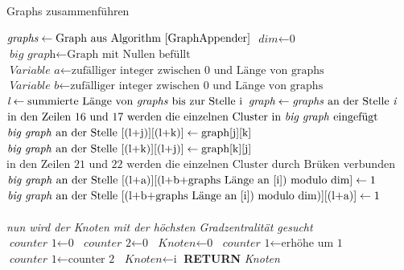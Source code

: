 \begin{algorithm}
\caption{Graphs zusammenführen}\label{uniteGraphs}
\begin{algorithmic}[1]
\State $\textit{graphs} \gets \text{Graph aus Algorithm \ref{GraphAppender}}$
\State {}
\EndIf
\State $\textit{dim} \gets \text{0}$
\State $\textit{big graph} \gets \text{Graph mit Nullen befüllt}$
\State $\textit{Variable a} \gets \text{zufälliger integer zwischen 0 und Länge von graphs}$
\State $\textit{Variable b} \gets \text{zufälliger integer zwischen 0 und Länge von graphs}$
\State $\textit{l} \gets \text{summierte Länge von \textit{graphs} bis zur Stelle i}$
\State $\textit{graph} \gets \text{\textit{graphs} an der Stelle \textit{i}}$
\\
\State $\text{in den Zeilen 16 und 17 werden die einzelnen Cluster in \textit{big graph} eingefügt}$
\\
\State $\text{\textit{big graph} an der Stelle [(l+j)][(l+k)]} \gets \text{graph[j][k]}$
\State $\text{\textit{big graph} an der Stelle [(l+k)][(l+j)]} \gets \text{graph[k][j]}$
\\ 
\State $\text{in den Zeilen 21 und 22 werden die einzelnen Cluster durch Brüken verbunden}$
\\
\State $\text{\textit{big graph} an der Stelle [(l+a)][(l+b+graphs Länge an [i]) modulo dim]} \gets \text{1}$
\State $\text{\textit{big graph} an der Stelle [(l+b+graphs Länge an [i]) modulo dim)][(l+a)]} \gets \text{1}$
\EndFor
\EndFor
\\
\\
\textit{nun wird der Knoten mit der höchsten Gradzentralität gesucht}\\
\State $\textit{counter 1} \gets \text{0}$
\State $\textit{counter 2} \gets \text{0}$
\State $\textit{Knoten} \gets \text{0}$
\State $\textit{counter 1} \gets \text{erhöhe um 1}$
\State $\textit{counter 1} \gets \text{counter 2}$
\State $\textit{Knoten} \gets \text{i}$
\EndIf
\EndIf
\EndFor
\textbf{RETURN} \textit{Knoten}
\EndProcedure
\end{algorithmic}
\end{algorithm}

